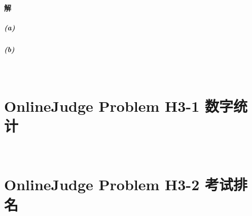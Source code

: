 \documentclass{article}
\begin{document}
\paragraph{解}
\subparagraph{(a)}
\subparagraph{(b)}
\\

\section{OnlineJudge Problem H3-1 数字统计}
\\

\section{OnlineJudge Problem H3-2 考试排名}
\\
\end{document}
